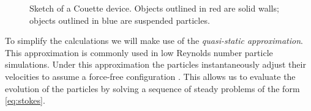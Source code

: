 \begin{figure}[!h]
\begin{center}
\end{center}
\caption[Sketch of a Couette device.]{Sketch of a Couette device. Objects outlined in red are solid walls;  objects outlined in blue are suspended particles.}\label{fig:couette}
\end{figure}

To simplify the calculations we will make use of the \textit{quasi-static approximation}. This approximation is commonly used in low Reynolds number particle simulations. Under this approximation the particles instantaneously adjust their velocities to assume a force-free configuration \cite{Kropinski1997}. This allows us to evaluate the  evolution of the particles by solving a sequence of steady problems of the form \eqref{eq:stokes}. 

